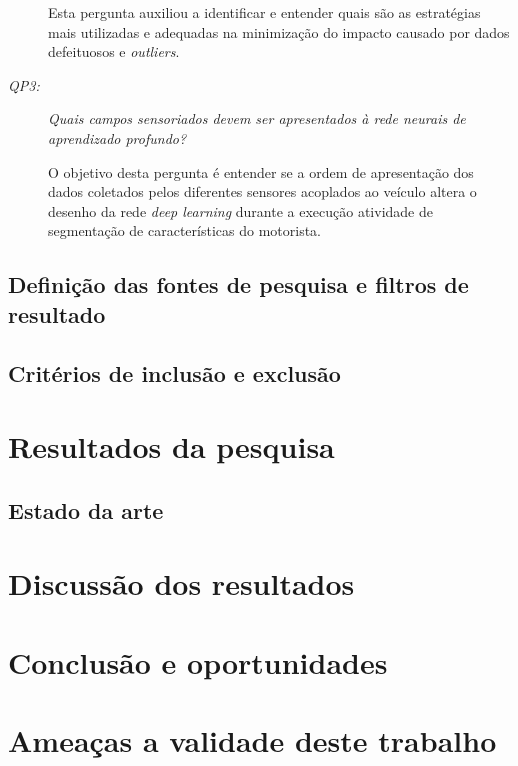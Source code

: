 \documentclass[10pt,journal,compsoc]{IEEEtran}
\begin{document}
\begin{description}
\begin{adjustwidth}{}{}
    Esta pergunta auxiliou a identificar e entender quais são as estratégias mais
    utilizadas e adequadas na minimização do impacto causado por dados defeituosos e \textit{outliers}.
  \end{adjustwidth}
    \vspace{0.3cm}
\item [\emph{QP3: }]\emph{Quais campos sensoriados devem ser
    apresentados à rede neurais de aprendizado profundo?}
    \vspace{0.15cm}
    \begin{adjustwidth}{}{}
      O objetivo desta pergunta é entender se a ordem de apresentação
      dos dados coletados pelos diferentes sensores acoplados ao
      veículo altera o desenho da rede \textit{deep learning} durante
      a execução atividade de segmentação de características do motorista.
    \end{adjustwidth}
\end{description}

\subsection{Definição das fontes de pesquisa e filtros de resultado}

\subsection{Critérios de inclusão e exclusão}
\label{sec:protocolo:inclusao}

\section{Resultados da pesquisa}
\label{sec:resultados}
\subsection{Estado da arte}


\section{Discussão dos resultados}
\label{sec:discussao}

\section{Conclusão e oportunidades}
\label{sec:conclusao}

\section{Ameaças a validade deste trabalho}
\label{sec:validade}
\end{document}
